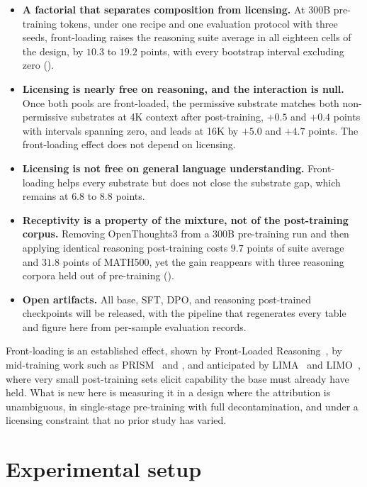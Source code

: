 \documentclass{article}
\begin{document}
\begin{itemize}
\item \textbf{A factorial that separates composition from licensing.} At 300B pre-training tokens, under one recipe and one evaluation protocol with three seeds, front-loading raises the reasoning suite average in all eighteen cells of the design, by $10.3$ to $19.2$ points, with every bootstrap interval excluding zero ().
\item \textbf{Licensing is nearly free on reasoning, and the interaction is null.} Once both pools are front-loaded, the permissive substrate matches both non-permissive substrates at 4K context after post-training, $+0.5$ and $+0.4$ points with intervals spanning zero, and leads at 16K by $+5.0$ and $+4.7$ points. The front-loading effect does not depend on licensing.
\item \textbf{Licensing is not free on general language understanding.} Front-loading helps every substrate but does not close the substrate gap, which remains at $6.8$ to $8.8$ points.
\item \textbf{Receptivity is a property of the mixture, not of the post-training corpus.} Removing OpenThoughts3 from a 300B pre-training run and then applying identical reasoning post-training costs $9.7$ points of suite average and $31.8$ points of MATH500, yet the gain reappears with three reasoning corpora held out of pre-training ().
\item \textbf{Open artifacts.} All base, SFT, DPO, and reasoning post-trained checkpoints will be released, with the pipeline that regenerates every table and figure here from per-sample evaluation records.
\end{itemize}

Front-loading is an established effect, shown by Front-Loaded Reasoning~\citep{akter2025front}, by mid-training work such as PRISM~\citep{runwal2026prism} and \citet{zhang2026interplay}, and anticipated by LIMA~\citep{zhou2023lima} and LIMO~\citep{yelimo}, where very small post-training sets elicit capability the base must already have held. What is new here is measuring it in a design where the attribution is unambiguous, in single-stage pre-training with full decontamination, and under a licensing constraint that no prior study has varied.

\section{Experimental setup}
\label{sec:methods}
\end{document}
